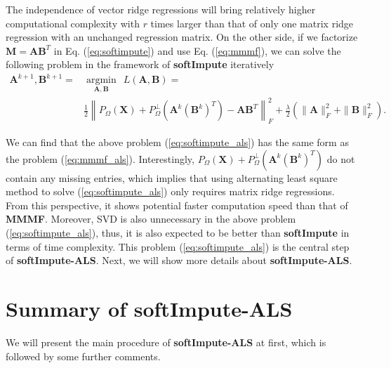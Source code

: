 \documentclass[11pt]{article}
\begin{document}
The independence of vector ridge regressions will bring relatively higher computational complexity with $r$ times larger than that of only one matrix ridge regression with an unchanged regression matrix. On the other side,  
if we factorize $\boldsymbol{M} = \boldsymbol{AB}^T$ in Eq. (\ref{eq:softimpute}) and use Eq. (\ref{eq:mmmf}), we can solve the following problem in the framework of  \textbf{softImpute} iteratively
\begin{equation}
	\begin{split}
	\boldsymbol{A}^{k+1},\boldsymbol{B}^{k+1} =&\underset{\boldsymbol{A},\boldsymbol{B}}{\operatorname{argmin}} \ \ L(\boldsymbol{A},\boldsymbol{B})=\\ &\frac{1}{2}\left\|P_{\Omega}(\boldsymbol{X})+P_{\Omega}^{\perp}(\boldsymbol{A}^k(\boldsymbol{B}^k)^T)-\boldsymbol{AB}^T\right\|_{F}^{2}+\frac{\lambda}{2}\left(\|\boldsymbol{A}\|_{F}^{2}+\|\boldsymbol{B}\|_{F}^{2}\right).
	\label{eq:softimpute_als}
	\end{split}
\end{equation}

We can find that the above problem (\ref{eq:softimpute_als}) has the same form as the problem (\ref{eq:mmmf_als}). Interestingly, $P_{\Omega}(\boldsymbol{X})+P_{\Omega}^{\perp}(\boldsymbol{A}^k(\boldsymbol{B}^k)^T)$ do not contain any missing entries, which implies that using  alternating least square method to solve (\ref{eq:softimpute_als}) only requires matrix ridge regressions. From this perspective, it shows potential faster computation speed than that of \textbf{ MMMF}. Moreover,  SVD is also unnecessary in the above problem (\ref{eq:softimpute_als}), thus, it is also expected to be better than \textbf{softImpute} in terms of time complexity. This problem (\ref{eq:softimpute_als}) is the central step of \textbf{softImpute-ALS}. Next, we will show more details about \textbf{softImpute-ALS}.


\section{Summary of softImpute-ALS}

	We will present the main procedure of \textbf{softImpute-ALS} at first, which is followed by some further comments. 
	
\end{document}
